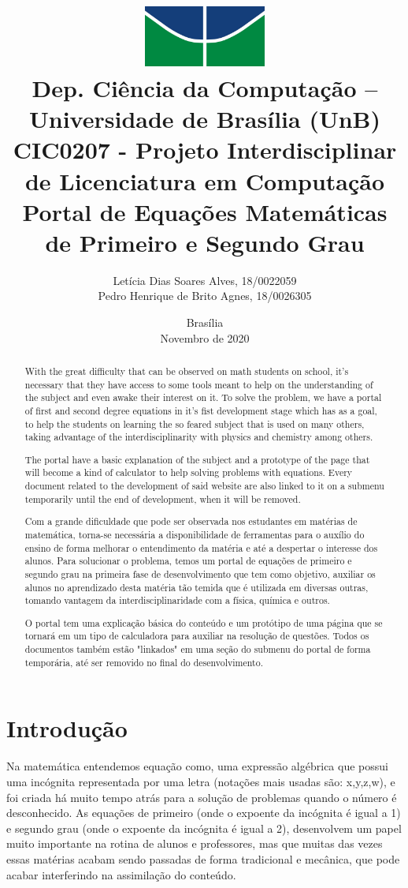 \documentclass[12pt]{report}
\title{
        \includegraphics[width=4cm]{img/logo.jpg} \\ 
        \large
        Dep. Ciência da Computação -- Universidade de Brasília (UnB)\\
        CIC0207 - Projeto Interdisciplinar de Licenciatura em Computação \\
        \vfill 
        \vfill
        \LARGE
        \textbf{Portal de Equações Matemáticas de Primeiro e Segundo Grau}
    }
\author{
        Letícia Dias Soares Alves, 18/0022059\\
        Pedro Henrique de Brito Agnes, 18/0026305
    }
\affil{
        \vfill
        \vfill
        \vfill
        Professora \\
        Dr.a Letícia Lopes Leite
    }
\date{Brasília\\Novembro de 2020}
\begin{document}
\maketitle

\begin{abstract}
  With the great difficulty that can be observed on math students on school, it's necessary that they have access to some tools meant to help on the understanding of the subject and even awake their interest on it. To solve the problem, we have a portal of first and second degree equations in it's fist development stage which has as a goal, to help the students on learning the so feared subject that is used on many others, taking advantage of the interdisciplinarity with physics and chemistry among others.

  The portal have a basic explanation of the subject and a prototype of the page that will become a kind of calculator to help solving problems with equations. Every document related to the development of said website are also linked to it on a submenu temporarily until the end of development, when it will be removed.
\end{abstract}

\begin{abstract}
  Com a grande dificuldade que pode ser observada nos estudantes em matérias de matemática, torna-se necessária a disponibilidade de ferramentas para o auxílio do ensino de forma melhorar o entendimento da matéria e até a despertar o interesse dos alunos. Para solucionar o problema, temos um portal de equações de primeiro e segundo grau na primeira fase de desenvolvimento que tem como objetivo, auxiliar os alunos no aprendizado desta matéria tão temida que é utilizada em diversas outras, tomando vantagem da interdisciplinaridade com a física, química e outros.

  O portal tem uma explicação básica do conteúdo e um protótipo de uma página que se tornará em um tipo de calculadora para auxiliar na resolução de questões. Todos os documentos também estão "linkados" em uma seção do submenu do portal de forma temporária, até ser removido no final do desenvolvimento.
\end{abstract}

\tableofcontents
\newpage

\chapter{Introdução}
Na matemática entendemos equação como, uma expressão algébrica que possui uma incógnita representada por uma letra (notações mais usadas são: x,y,z,w), e foi criada há muito tempo atrás para a solução de problemas quando o número é desconhecido. As equações de primeiro (onde o expoente da incógnita é igual a 1) e segundo grau  (onde o expoente da incógnita é igual a 2), desenvolvem um papel muito importante na rotina de alunos e professores, mas que muitas das vezes essas matérias acabam sendo passadas de forma tradicional e mecânica, que pode acabar interferindo na assimilação do conteúdo.
\end{document}
